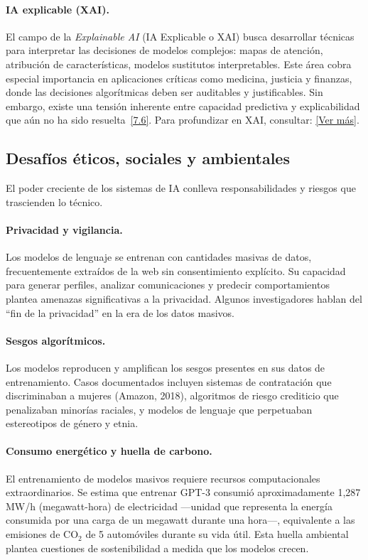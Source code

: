 \documentclass[12pt,a4paper]{report}
\numberwithin{figure}{section}
\begin{document}
\paragraph{IA explicable (XAI).}
El campo de la \textit{Explainable AI} (IA Explicable o XAI) busca desarrollar técnicas para interpretar las decisiones de modelos complejos: mapas de atención, atribución de características, modelos sustitutos interpretables. Este área cobra especial importancia en aplicaciones críticas como medicina, justicia y finanzas, donde las decisiones algorítmicas deben ser auditables y justificables. Sin embargo, existe una tensión inherente entre capacidad predictiva y explicabilidad que aún no ha sido resuelta~\hyperref[ref:7]{[7.6]}. Para profundizar en XAI, consultar: \href{https://www.darpa.mil/program/explainable-artificial-intelligence}{[Ver más]}.

\subsection{Desafíos éticos, sociales y ambientales}
\label{subsec:desafios_eticos}

El poder creciente de los sistemas de IA conlleva responsabilidades y riesgos que trascienden lo técnico.

\paragraph{Privacidad y vigilancia.}
Los modelos de lenguaje se entrenan con cantidades masivas de datos, frecuentemente extraídos de la web sin consentimiento explícito. Su capacidad para generar perfiles, analizar comunicaciones y predecir comportamientos plantea amenazas significativas a la privacidad. Algunos investigadores hablan del ``fin de la privacidad'' en la era de los datos masivos.

\paragraph{Sesgos algorítmicos.}
Los modelos reproducen y amplifican los sesgos presentes en sus datos de entrenamiento. Casos documentados incluyen sistemas de contratación que discriminaban a mujeres (Amazon, 2018), algoritmos de riesgo crediticio que penalizaban minorías raciales, y modelos de lenguaje que perpetuaban estereotipos de género y etnia.

\paragraph{Consumo energético y huella de carbono.}
El entrenamiento de modelos masivos requiere recursos computacionales extraordinarios. Se estima que entrenar GPT-3 consumió aproximadamente 1,287 MW/h (megawatt-hora) de electricidad ---unidad que representa la energía consumida por una carga de un megawatt durante una hora---, equivalente a las emisiones de CO$_2$ de 5 automóviles durante su vida útil. Esta huella ambiental plantea cuestiones de sostenibilidad a medida que los modelos crecen.
\end{document}
